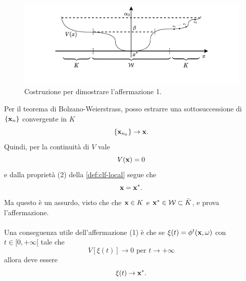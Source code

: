 \begin{steps}
    \hfill
    \begin{minipage}{.8\textwidth}
        \begin{figure}[H]
            \centering
            \includegraphics[width=\textwidth,clip,trim=2.2cm 1cm 2.2cm 0]{assets/ljapunov-dim-aff1}
            \caption[Costruzione 1 per teorema di Ljapunov]{Costruzione per dimostrare
            l'affermazione 1.}
            \label{fig:ljapunov-dim-aff1}
        \end{figure}
    \end{minipage}

    Per il teorema di Bolzano-Weierstrass, posso estrarre una
    sottosuccessione di $\{\mathbf{x}_n\}$ convergente in $K$
    \begin{equation*}
    \{\mathbf{x}_ {n_k}\} \to \mathbf{x}.
    \end{equation*}
    Quindi, per la continuità di $V$ vale
    \begin{equation*}
        V(\mathbf{x}) = 0
    \end{equation*}
    e dalla proprietà (2) della \autoref{def:clf-local}
    segue che
    \begin{equation*}
        \mathbf{x} = \mathbf{x}^*.
    \end{equation*}
    Ma questo è un assurdo, visto che che $\mathbf{x} \in K$
    e $\mathbf{x}^* \in \mathcal W \subset \bar K$, e prova l'affermazione.

    \hfill\openbox\paragraph{}

    Una conseguenza utile dell'affermazione (1) è che se
    $\xi(t) = \phi^t(\mathbf{x}, \omega)$ con $t \in [0, +\infty[$ tale che
    \begin{equation*}
        V[\xi(t)] \to 0 \text{ per } t \to +\infty
    \end{equation*}
    allora deve essere
    \begin{equation}
        \xi(t) \to \mathbf{x}^*.
        \label{eq:xi-to-xstar}
    \end{equation}



\end{steps}
